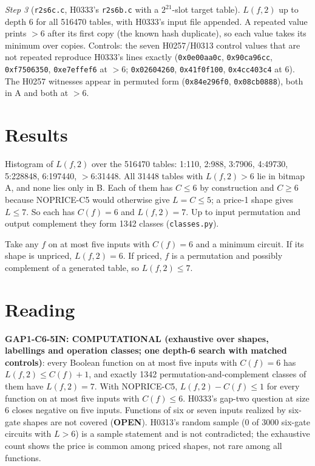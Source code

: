 \documentclass[11pt]{article}
\begin{document}
\emph{Step 3} (\texttt{r2s6c.c}, H0333's \texttt{r2s6b.c} with a $2^{21}$-slot target table). $L(f,2)$ up to depth 6 for all 516470 tables, with H0333's input file appended. A repeated value prints $>6$ after its first copy (the known hash duplicate), so each value takes its minimum over copies. Controls: the seven H0257/H0313 control values that are not repeated reproduce H0333's lines exactly (\texttt{0x0e00aa0c}, \texttt{0x90ca96cc}, \texttt{0xf7506350}, \texttt{0xe7effef6} at $>6$; \texttt{0x02604260}, \texttt{0x41f0f100}, \texttt{0x4cc403c4} at $6$). The H0257 witnesses appear in permuted form (\texttt{0x84e296f0}, \texttt{0x08cb0888}), both in A and both at $>6$.

\section*{Results}
Histogram of $L(f,2)$ over the 516470 tables: 1:110, 2:988, 3:7906, 4:49730, 5:228848, 6:197440, $>6$:31448. All 31448 tables with $L(f,2)>6$ lie in bitmap A, and none lies only in B. Each of them has $C\le6$ by construction and $C\ge6$ because NOPRICE-C5 would otherwise give $L=C\le5$; a price-1 shape gives $L\le7$. So each has $C(f)=6$ and $L(f,2)=7$. Up to input permutation and output complement they form 1342 classes (\texttt{classes.py}).

Take any $f$ on at most five inputs with $C(f)=6$ and a minimum circuit. If its shape is unpriced, $L(f,2)=6$. If priced, $f$ is a permutation and possibly complement of a generated table, so $L(f,2)\le7$.

\section*{Reading}
\textbf{GAP1-C6-5IN: COMPUTATIONAL (exhaustive over shapes, labellings and operation classes; one depth-6 search with matched controls)}: every Boolean function on at most five inputs with $C(f)=6$ has $L(f,2)\le C(f)+1$, and exactly 1342 permutation-and-complement classes of them have $L(f,2)=7$. With NOPRICE-C5, $L(f,2)-C(f)\le1$ for every function on at most five inputs with $C(f)\le6$. H0333's gap-two question at size 6 closes negative on five inputs. Functions of six or seven inputs realized by six-gate shapes are not covered (\textbf{OPEN}). H0313's random sample (0 of 3000 six-gate circuits with $L>6$) is a sample statement and is not contradicted; the exhaustive count shows the price is common among priced shapes, not rare among all functions.
\end{document}

